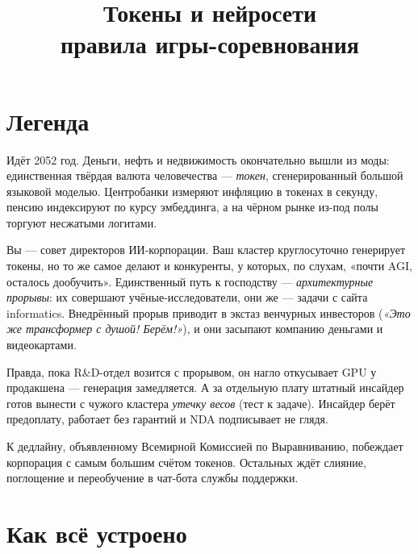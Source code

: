 \documentclass[12pt,a4paper]{article}
\title{\textbf{\textcolor{inknavy}{Токены и нейросети}}\\[4pt]
\large правила игры-соревнования}
\date{}
\begin{document}
\maketitle
\vspace{-2.5em}

\section*{Легенда}

Идёт 2052 год. Деньги, нефть и недвижимость окончательно вышли из моды:
единственная твёрдая валюта человечества --- \emph{токен}, сгенерированный
большой языковой моделью. Центробанки измеряют инфляцию в токенах в секунду,
пенсию индексируют по курсу эмбеддинга, а на чёрном рынке из-под полы
торгуют несжатыми логитами.

Вы --- совет директоров ИИ-корпорации. Ваш кластер круглосуточно генерирует
токены, но то же самое делают и конкуренты, у которых, по слухам,
«почти AGI, осталось дообучить». Единственный путь к господству ---
\emph{архитектурные прорывы}: их совершают учёные-исследователи,
они же --- задачи с сайта informatics. Внедрённый прорыв приводит
в экстаз венчурных инвесторов (\emph{«Это же трансформер с душой!
Берём!»}), и они засыпают компанию деньгами и видеокартами.

Правда, пока R\&D-отдел возится с прорывом, он нагло откусывает GPU
у продакшена --- генерация замедляется. А за отдельную плату штатный
инсайдер готов вынести с чужого кластера \emph{утечку весов} (тест
к задаче). Инсайдер берёт предоплату, работает без гарантий и NDA
подписывает не глядя.

К дедлайну, объявленному Всемирной Комиссией по Выравниванию, побеждает
корпорация с самым большим счётом токенов. Остальных ждёт слияние,
поглощение и переобучение в чат-бота службы поддержки.

\section*{Как всё устроено}
\end{document}
